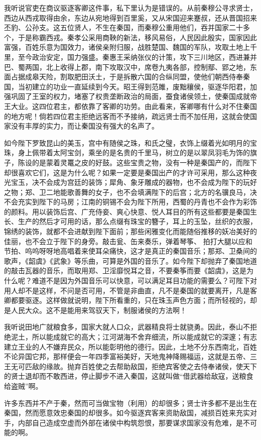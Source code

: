 \documentclass[12pt,UTF-8,openany,a4]{ctexbook}
\begin{document}
\begin{large}
    \yiwen 
    我听说官吏在商议驱逐客卿这件事，私下里认为是错误的。从前秦穆公寻求贤士，西边从西戎取得由余，东边从宛地得到百里奚，又从宋国迎来蹇叔，还从晋国招来丕豹、公孙支。这五位贤人，不生在秦国，而秦穆公重用他们，吞并国家二十多个，于是称霸西戎。秦孝公采用商鞅的新法，移风易俗，人民因此殷实，国家因此富强，百姓乐意为国效力，诸侯亲附归服，战胜楚国、魏国的军队，攻取土地上千里，至今政治安定，国力强盛。秦惠王采纳张仪的计策，攻下三川地区，西进兼并巴、蜀两国，北上收得上郡，南下攻取汉中，席卷九夷各部，控制鄢、郢之地，东面占据成皋天险，割取肥田沃土，于是拆散六国的合纵同盟，使他们朝西侍奉秦国，当初建立的功业一直延续到今天。昭王得到范雎，废黜穰侯，驱逐华阳君，加强巩固了王室的权力，堵塞了权贵垄断政治的局面，蚕食诸侯领土，使秦国成就帝王大业。这四位君主，都依靠了客卿的功劳。由此看来，客卿哪有什么对不住秦国的地方呢！倘若四位君主拒绝远客而不予接纳，疏远贤士而不加任用，这就会使国家没有丰厚的实力，而让秦国没有强大的名声了。
    
    如今陛下罗致昆山的美玉，宫中有随侯之珠，和氏之璧，衣饰上缀着光如明月的宝珠，身上佩带着太阿宝剑，乘坐的是名贵的千里马，树立的是以翠凤羽毛为饰的旗子，陈设的是蒙着灵鼍之皮的好鼓。这些宝贵之物，没有一种是秦国产的，而陛下却很喜欢它们，这是为什么呢？如果一定要是秦国出产的才许可采用，那么这种夜光宝玉，决不会成为宫廷的装饰；犀角、象牙雕成的器物，也不会成为陛下的玩好之物；郑、卫二地能歌善舞的女子，也不会填满陛下的后宫；北方的名骥良马，决不会充实到陛下的马房；江南的铜锡不会为陛下所用，西蜀的丹青也不会作为彩饰的颜料。用以装饰后宫、广充侍妾、爽心快意、悦人耳目的所有这些都要是秦国生长、生产的然后才可用的话，那么点缀有珠宝的簪子，耳上的玉坠，丝织的衣服，锦绣的装饰，就都不会进献到陛下面前；那些闲雅变化而能随俗推移的妖冶美好的佳丽，也不会立于陛下的身旁。敲击瓮、缶来奏乐，弹着琴筝、 拍打大腿以应和节拍、呜呜呀呀地高唱着来使耳朵痛快，这才是真正的秦国音乐；那郑、卫桑间的歌声，《韶虞》《武象》等乐曲，可算是外国的音乐了。如今陛下却抛弃了秦国地道的敲击瓦器的音乐，而取用郑、卫淫靡悦耳之音，不要秦筝而要《韶虞》，这是为什么呢？难道不是因为外国音乐可以快意，可以满足耳目功能的需要么？可陛下对用人却不是这样，不问是否可用，不管是非曲直，凡不是秦国的就要离开，凡是客卿都要驱逐。这样做就说明，陛下所看重的，只在珠玉声色方面；而所轻视的，却是人民大众。这不是能用来驾驭天下，制服诸侯的方法啊！
    
    我听说田地广就粮食多，国家大就人口众，武器精良将士就骁勇。因此，泰山不拒绝泥土，所以能成就它的高大；江河湖海不舍弃细流，所以能成就它的深邃；有志建立王业的人不嫌弃民众，所以能彰明他的德行。因此，土地不分东西南北，百姓不论异国它邦，那样便会一年四季富裕美好，天地鬼神降赐福运，这就是五帝、三王无可匹敌的缘故。抛弃百姓使之去帮助敌国，拒绝宾客使之去侍奉诸侯，使天下的贤士退却而不敢西进，停止脚步不进入秦国，这就叫做“借武器给敌寇，送粮食给盗贼”啊。
    
    许多东西并不产于秦，然而可当做宝物（利用）的却很多；贤士许多都不是出生在秦国，然而愿意效忠秦国的却很多。如今驱逐宾客来资助敌国，减损百姓来充实对手，内部自己造成空虚而外部在诸侯中构筑怨恨，那要谋求国家没有危难，是不可能的啊。
    
\end{large}
\end{document}
